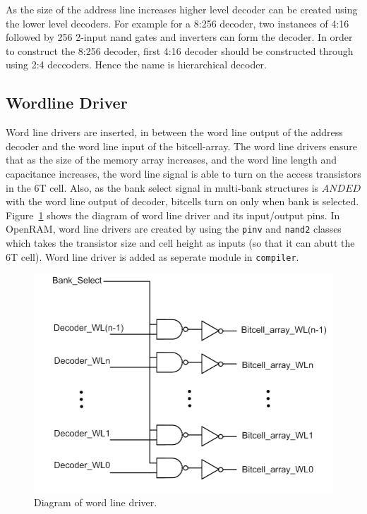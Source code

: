 As the size of the address line increases higher level decoder can be created using the lower level decoders. For example for a 8:256 decoder, two instances of 4:16 followed by 256 2-input nand gates and inverters 
can form the decoder. In order to construct the 8:256 decoder, first 4:16 decoder should be constructed through using 2:4 deccoders. Hence the name is hierarchical decoder.


\subsection{Wordline Driver}
\label{sec:wldriver}

Word line drivers are inserted, in between the word line
output of the address decoder and the word line input of the bitcell-array.  The word
line drivers ensure that as the size of the memory array increases,
and the word line length and capacitance increases, the word line
signal is able to turn on the access transistors in the 6T cell. Also, as the bank select signal
in multi-bank structures is $ANDED$ with the word line output of decoder, 
bitcells turn on only when bank is selected. 
Figure~\ref{fig:wordline_driver} shows the diagram of word line driver and its input/output pins.
In OpenRAM, word line drivers are created by using the \verb|pinv| and \verb|nand2| classes which
takes the transistor size and cell height as inputs (so that it can abutt the
6T cell). Word line driver is added as seperate module in \verb|compiler|.
\begin{figure}[h!]
\centering
\includegraphics[scale=.8]{./figs/wordline_driver.pdf}
\caption{Diagram of word line driver.}
\label{fig:wordline_driver}
\end{figure}



